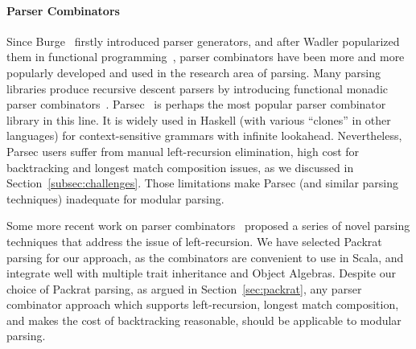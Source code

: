 
\paragraph{Parser Combinators} Since Burge~\cite{burge1975} firstly
introduced parser generators, and after Wadler popularized them
in functional programming~\cite{Wadler1985}, parser combinators have been
more and more popularly developed and used in the research area of
parsing. Many parsing libraries produce recursive descent
parsers by introducing functional monadic
parser combinators~\cite{nott237}. Parsec~\cite{Leijen2001} is
perhaps the most popular parser combinator library in this line.
It is widely used in Haskell (with various ``clones'' in other languages)
for context-sensitive grammars with infinite lookahead. Nevertheless,
Parsec users suffer from manual left-recursion elimination,
high cost for backtracking and longest match composition issues,
as we discussed in Section~\ref{subsec:challenges}. Those limitations make Parsec
(and similar parsing techniques) inadequate for modular parsing.

Some more recent work on parser
combinators~\cite{Ford2002,Might2011,Frost2008} proposed a series of
novel parsing techniques that address the issue of
left-recursion. We have selected Packrat parsing for our approach,
as the combinators are convenient to use in Scala, and
integrate well with multiple trait inheritance and
Object Algebras.
Despite our choice of Packrat parsing, as argued in Section~\ref{sec:packrat},
any parser combinator approach which supports left-recursion, longest
match composition, and makes the cost of backtracking reasonable,
should be applicable to modular parsing.

